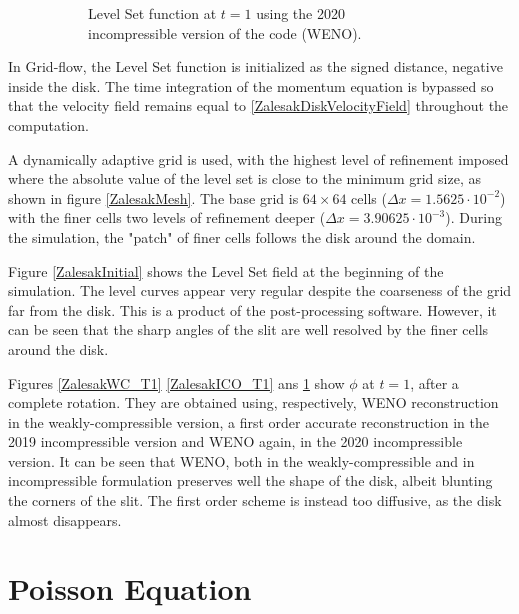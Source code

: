 \documentclass[11pt, a4paper, oneside, openany]{book}
\begin{document}
\begin{figure}[!ht]
\begin{subfigure}{.5\textwidth}
		\caption[Zalesak Incompressible New]{Level Set function at $t=1$ using the 2020\\incompressible version of the code (WENO).}\label{ZalesakICN_T1}
	\end{subfigure}
	\caption[Zalesak Results]{}\label{ZalesakResults}
\end{figure}\noindent
In Grid-flow, the Level Set function is initialized as the signed distance, negative inside the disk. The time integration of the momentum equation is bypassed so that the velocity field remains equal to \eqref{ZalesakDiskVelocityField} throughout the computation.\par
A dynamically adaptive grid is used, with the highest level of refinement imposed where the absolute value of the level set is close to the minimum grid size, as shown in figure \ref{ZalesakMesh}. The base grid is $64\times 64$ cells ($\Delta x = 1.5625\cdot10^{-2}$) with the finer cells two levels of refinement deeper ($\Delta x = 3.90625\cdot10^{-3}$). During the simulation, the "patch" of finer cells follows the disk around the domain.\par
Figure \ref{ZalesakInitial} shows the Level Set field at the beginning of the simulation. The level curves appear very regular despite the coarseness of the grid far from the disk. This is a product of the post-processing software. However, it can be seen that the sharp angles of the slit are well resolved by the finer cells around the disk.\par
Figures \ref{ZalesakWC_T1} \ref{ZalesakICO_T1} ans \ref{ZalesakICN_T1} show $\phi$ at $t=1$, after a complete rotation. 
They are obtained using, respectively, WENO reconstruction in the weakly-compressible version, a first order accurate reconstruction in the 2019 incompressible version and WENO again, in the 2020 incompressible version. It can be seen that WENO, both in the weakly-compressible and in incompressible formulation preserves well the shape of the disk, albeit blunting the corners of the slit. The first order scheme is instead too diffusive, as the disk almost disappears.
\section{Poisson Equation}\label{Chapter_Results_Poisson Equation}
\end{document}
